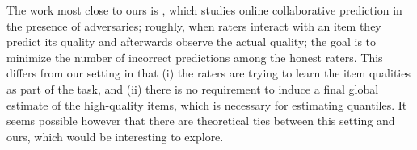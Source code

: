 
The work most close to ours is \citet{christiano2014provably,
christiano2016robust}, which studies online collaborative prediction in 
the presence of adversaries; roughly, when raters interact with an item 
they predict its quality and afterwards observe the actual quality; the 
goal is to minimize the number of incorrect 
predictions among the honest raters. This differs from our setting in that 
(i) the raters are trying to learn the item qualities as part of the task, 
and (ii) there is no requirement to induce a final global estimate of the 
high-quality items, which is necessary for estimating quantiles.
It seems possible however that there are theoretical ties between this 
setting and ours, which would be interesting to explore.

